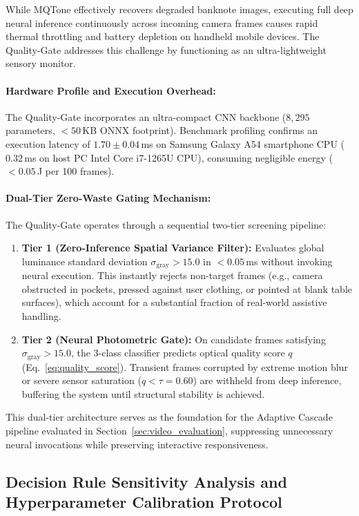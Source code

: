 \documentclass[final,5p,times,twocolumn,authoryear]{elsarticle}
\begin{document}
While MQTone effectively recovers degraded banknote images, executing full deep neural inference continuously across incoming camera frames causes rapid thermal throttling and battery depletion on handheld mobile devices. The Quality-Gate addresses this challenge by functioning as an ultra-lightweight sensory monitor.

\paragraph{Hardware Profile and Execution Overhead:}
The Quality-Gate incorporates an ultra-compact CNN backbone ($8{,}295$ parameters, $<50$\,KB ONNX footprint). Benchmark profiling confirms an execution latency of $1.70 \pm 0.04$\,ms on Samsung Galaxy A54 smartphone CPU ($0.32$\,ms on host PC Intel Core i7-1265U CPU), consuming negligible energy ($<0.05$\,J per 100 frames).


\paragraph{Dual-Tier Zero-Waste Gating Mechanism:}
The Quality-Gate operates through a sequential two-tier screening pipeline:
\begin{enumerate}[label=(\alph*)]
    \item \textbf{Tier 1 (Zero-Inference Spatial Variance Filter):} Evaluates global luminance standard deviation $\sigma_{\text{gray}} > 15.0$ in $<0.05$\,ms without invoking neural execution. This instantly rejects non-target frames (e.g., camera obstructed in pockets, pressed against user clothing, or pointed at blank table surfaces), which account for a substantial fraction of real-world assistive handling.
    \item \textbf{Tier 2 (Neural Photometric Gate):} On candidate frames satisfying $\sigma_{\text{gray}} > 15.0$, the 3-class classifier predicts optical quality score $q$ (Eq.~\ref{eq:quality_score}). Transient frames corrupted by extreme motion blur or severe sensor saturation ($q < \tau = 0.60$) are withheld from deep inference, buffering the system until structural stability is achieved.
\end{enumerate}
This dual-tier architecture serves as the foundation for the Adaptive Cascade pipeline evaluated in Section~\ref{sec:video_evaluation}, suppressing unnecessary neural invocations while preserving interactive responsiveness.

\subsection{Decision Rule Sensitivity Analysis and Hyperparameter Calibration Protocol}
\label{subsec:rule_sensitivity}
\end{document}

